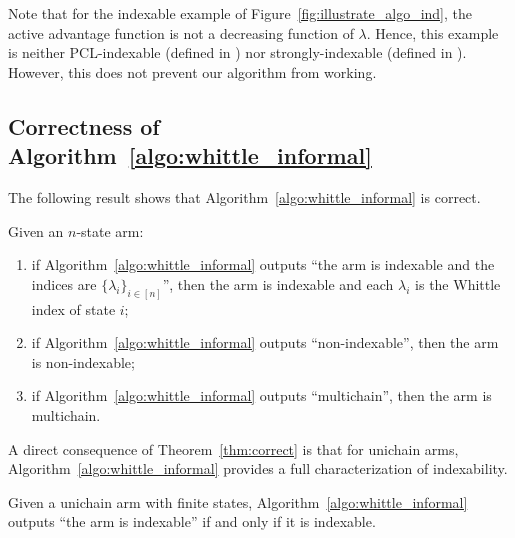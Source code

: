 \noindent Note that for the indexable example of Figure~\ref{fig:illustrate_algo_ind}, the active advantage function is not a decreasing function of $\lambda$. Hence, this example is neither PCL-indexable (defined in \cite[Definition~3]{nino2020fast}) nor strongly-indexable (defined in \cite{nakhleh2021neurwin}). However, this does not prevent our algorithm from working. 

\subsection{Correctness of Algorithm~\ref{algo:whittle_informal}}

The following result shows that Algorithm~\ref{algo:whittle_informal} is correct.

\begin{thm}
    \label{thm:correct}
    Given an $n$-state arm:
    \begin{enumerate}[label=(\roman*)]
        \item \label{it:idx_proof} if Algorithm~\ref{algo:whittle_informal} outputs ``the arm is indexable and the indices are $\{\lambda_i\}_{i\in[n]}$'', then the arm is indexable and each $\lambda_i$ is the Whittle index of state $i$;
        \item \label{it:non_idx_proof} if Algorithm~\ref{algo:whittle_informal} outputs ``non-indexable'', then the arm is non-indexable;
        \item \label{it:multi_chain} if Algorithm~\ref{algo:whittle_informal} outputs ``multichain'', then the arm is multichain.
    \end{enumerate}
\end{thm}
A direct consequence of Theorem~\ref{thm:correct} is that for unichain arms, Algorithm~\ref{algo:whittle_informal} provides a full characterization of indexability. 
\begin{cor}
    \label{coro:correct_unichain}
    Given a unichain arm with finite states, Algorithm~\ref{algo:whittle_informal} outputs ``the arm is indexable'' if and only if it is indexable. 
\end{cor}

